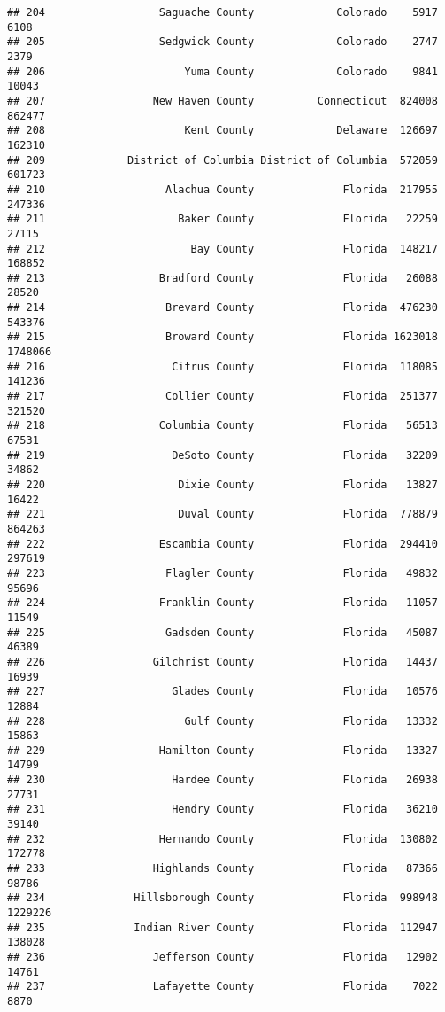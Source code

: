 \documentclass[
]{article}
\begin{document}
\begin{verbatim}
## 204                  Saguache County             Colorado    5917    6108
## 205                  Sedgwick County             Colorado    2747    2379
## 206                      Yuma County             Colorado    9841   10043
## 207                 New Haven County          Connecticut  824008  862477
## 208                      Kent County             Delaware  126697  162310
## 209             District of Columbia District of Columbia  572059  601723
## 210                   Alachua County              Florida  217955  247336
## 211                     Baker County              Florida   22259   27115
## 212                       Bay County              Florida  148217  168852
## 213                  Bradford County              Florida   26088   28520
## 214                   Brevard County              Florida  476230  543376
## 215                   Broward County              Florida 1623018 1748066
## 216                    Citrus County              Florida  118085  141236
## 217                   Collier County              Florida  251377  321520
## 218                  Columbia County              Florida   56513   67531
## 219                    DeSoto County              Florida   32209   34862
## 220                     Dixie County              Florida   13827   16422
## 221                     Duval County              Florida  778879  864263
## 222                  Escambia County              Florida  294410  297619
## 223                   Flagler County              Florida   49832   95696
## 224                  Franklin County              Florida   11057   11549
## 225                   Gadsden County              Florida   45087   46389
## 226                 Gilchrist County              Florida   14437   16939
## 227                    Glades County              Florida   10576   12884
## 228                      Gulf County              Florida   13332   15863
## 229                  Hamilton County              Florida   13327   14799
## 230                    Hardee County              Florida   26938   27731
## 231                    Hendry County              Florida   36210   39140
## 232                  Hernando County              Florida  130802  172778
## 233                 Highlands County              Florida   87366   98786
## 234              Hillsborough County              Florida  998948 1229226
## 235              Indian River County              Florida  112947  138028
## 236                 Jefferson County              Florida   12902   14761
## 237                 Lafayette County              Florida    7022    8870

\end{verbatim}
\end{document}
